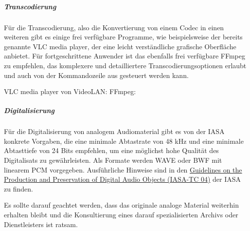 \subparagraph{Transcodierung} Für die Transcodierung, also die Konvertierung von einem Codec in einen weiteren gibt es einige frei verfügbare Programme, wie beispielsweise der bereits genannte VLC media player, der eine leicht verständliche grafische Oberfläche anbietet. Für fortgeschrittene Anwender ist das ebenfalls frei verfügbare FFmpeg zu empfehlen, das komplexere und detailliertere Transcodierungsoptionen erlaubt und auch von der Kommandozeile aus gesteuert werden kann. 

\begin{flushleft}
	VLC media player von VideoLAN: 
	FFmpeg: 
\end{flushleft}


\subparagraph{Digitalisierung}
Für die Digitalisierung von analogem Audiomaterial gibt es von der IASA konkrete Vorgaben, die eine minimale Abtastrate von 48 kHz und eine minimale Abtasttiefe von 24 Bits empfehlen, um eine möglichst hohe Qualität des Digitalisats zu gewährleisten. Als Formate werden WAVE oder BWF mit linearem PCM vorgegeben. Ausführliche Hinweise sind in den \href{http://www.iasa-web.org/tc04/audio-preservation}{Guidelines on the Production and Preservation of Digital Audio Objects (IASA-TC 04)} der IASA zu finden. 

Es sollte darauf geachtet werden, dass das originale analoge Material weiterhin erhalten bleibt und die Konsultierung eines darauf spezialisierten Archivs oder Dienstleisters ist ratsam.


